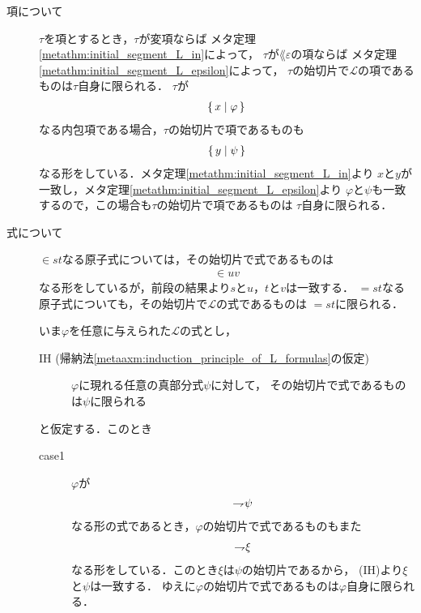 	\begin{metaprf}\mbox{}
		\begin{description}
			\item[項について]
				$\tau$を項とするとき，$\tau$が変項ならば
				メタ定理\ref{metathm:initial_segment_L_in}によって，
				$\tau$が$\lang{\varepsilon}$の項ならば
				メタ定理\ref{metathm:initial_segment_L_epsilon}によって，
				$\tau$の始切片で$\mathcal{L}$の項であるものは$\tau$自身に限られる．
				$\tau$が
				\begin{align}
					\{\, x \mid \varphi\, \}
				\end{align}
				なる内包項である場合，$\tau$の始切片で項であるものも
				\begin{align}
					\{\, y \mid \psi\, \}
				\end{align}
				なる形をしている．メタ定理\ref{metathm:initial_segment_L_in}より
				$x$と$y$が一致し，メタ定理\ref{metathm:initial_segment_L_epsilon}より
				$\varphi$と$\psi$も一致するので，この場合も$\tau$の始切片で項であるものは
				$\tau$自身に限られる．
				
			\item[式について]
				$\in st$なる原子式については，その始切片で式であるものは
				\begin{align}
					\in uv
				\end{align}
				なる形をしているが，前段の結果より$s$と$u$，$t$と$v$は一致する．
				$=st$なる原子式についても，その始切片で$\mathcal{L}$の式であるものは
				$=st$に限られる．
				
				いま$\varphi$を任意に与えられた$\mathcal{L}$の式とし，
				\begin{description}
					\item[IH (帰納法\ref{metaaxm:induction_principle_of_L_formulas}の仮定)]
						$\varphi$に現れる任意の真部分式$\psi$に対して，
						その始切片で式であるものは$\psi$に限られる
				\end{description}
				と仮定する．このとき
				\begin{description}
					\item[case1] $\varphi$が
						\begin{align}
							\rightharpoondown\hspace{-0.25em} \psi
						\end{align}
						なる形の式であるとき，$\varphi$の始切片で式であるものもまた
						\begin{align}
							\rightharpoondown\hspace{-0.25em} \xi
						\end{align}
						なる形をしている．このとき$\xi$は$\psi$の始切片であるから，
						(IH)より$\xi$と$\psi$は一致する．
						ゆえに$\varphi$の始切片で式であるものは$\varphi$自身に限られる．
			

\end{description}
\end{description}
\end{metaprf}
